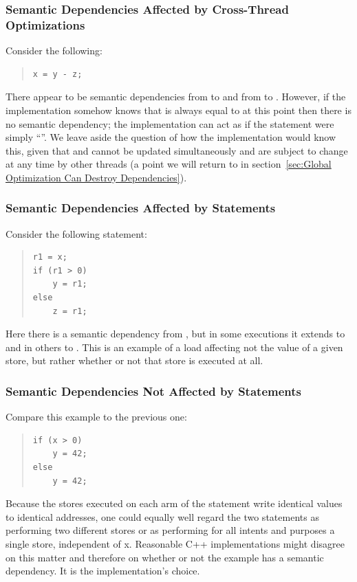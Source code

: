 \documentclass[10]{article}
\begin{document}
\subsubsection{Semantic Dependencies Affected by Cross-Thread Optimizations}
\label{sec:Semantic Dependencies Affected by Cross-Thread Optimizations}

Consider the following:
\begin{quote}
\begin{verbatim}
x = y - z;
\end{verbatim}
\end{quote}
There appear to be semantic dependencies from  to  and from 
to .
However, if the implementation somehow knows that  is
always equal to  at this point then there is no semantic dependency;
the implementation can act as if the statement were simply ``''.
We leave aside the question of how the implementation would know this,
given that  and  cannot be updated simultaneously
and are subject to change at any time by
other threads (a point we will return to in
section~\ref{sec:Global Optimization Can Destroy Dependencies}).

\subsubsection{Semantic Dependencies Affected by  Statements}
\label{sec:Semantic Dependencies Affected by if Statements}

Consider the following  statement:
\begin{quote}
\begin{verbatim}
r1 = x;
if (r1 > 0)
    y = r1;
else
    z = r1;
\end{verbatim}
\end{quote}
Here there is a semantic dependency from , but in some executions
it extends to  and in others to .
This is an example of a load affecting not the value of
a given store, but rather whether or not that store is executed at all.

\subsubsection{Semantic Dependencies Not Affected by  Statements}
\label{sec:Semantic Dependencies Not Affected by if Statements}

Compare this example to the previous one:
\begin{quote}
\begin{verbatim}
if (x > 0)
    y = 42;
else
    y = 42;
\end{verbatim}
\end{quote}
Because the stores executed on each arm of the  statement write
identical values to identical addresses, one could equally well regard
the two statements as performing two different stores or as performing
for all intents and purposes a single store, independent of x.
Reasonable C++ implementations might disagree on this matter and
therefore on whether or not the example has a semantic dependency.
It is the implementation's choice.
\end{document}
